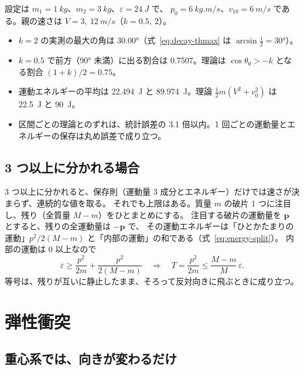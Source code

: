 設定は $m_1=\qty{1}{kg}$、$m_2=\qty{3}{kg}$、$\varepsilon=\qty{24}{J}$ で、
$p_0=\qty{6}{kg.m/s}$、$v_{10}=\qty{6}{m/s}$ である。親の速さは $V=3,\ \qty{12}{m/s}$（$k=0.5,\ 2$）。


\begin{itemize}
  \item $k=2$ の実測の最大の角は \ang{30.00}（式~\eqref{eq:decay-thmax} は $\arcsin\tfrac12=\ang{30}$）。
  \item $k=0.5$ で前方（\ang{90} 未満）に出る割合は 0.7507。理論は $\cos\theta_0>-k$ となる割合 $(1+k)/2=0.75$。
  \item 運動エネルギーの平均は \qty{22.494}{J} と \qty{89.974}{J}。理論 $\tfrac12m(V^2+v_0^2)$ は
    \qty{22.5}{J} と \qty{90}{J}。
  \item 区間ごとの理論とのずれは、統計誤差の 3.1 倍以内。1 回ごとの運動量とエネルギーの保存は丸め誤差で成り立つ。
\end{itemize}

\subsection{3 つ以上に分かれる場合}

3 つ以上に分かれると、保存則（運動量 3 成分とエネルギー）だけでは速さが決まらず、連続的な値を取る。
それでも上限はある。質量 $m$ の破片 1 つに注目し、残り（全質量 $M-m$）をひとまとめにする。
注目する破片の運動量を $\bm p$ とすると、残りの全運動量は $-\bm p$ で、
その運動エネルギーは「ひとかたまりの運動」$p^2/2(M-m)$ と「内部の運動」の和である（式~\eqref{eq:energy-split}）。
内部の運動は 0 以上なので
\begin{equation}
  \varepsilon\ge\frac{p^2}{2m}+\frac{p^2}{2(M-m)}
  \quad\Longrightarrow\quad
  T=\frac{p^2}{2m}\le\frac{M-m}{M}\,\varepsilon .
  \label{eq:many-body-max}
\end{equation}
等号は、残りが互いに静止したまま、そろって反対向きに飛ぶときに成り立つ。

\section{弾性衝突}\label{sec:coll-elastic}

\subsection{重心系では、向きが変わるだけ}

